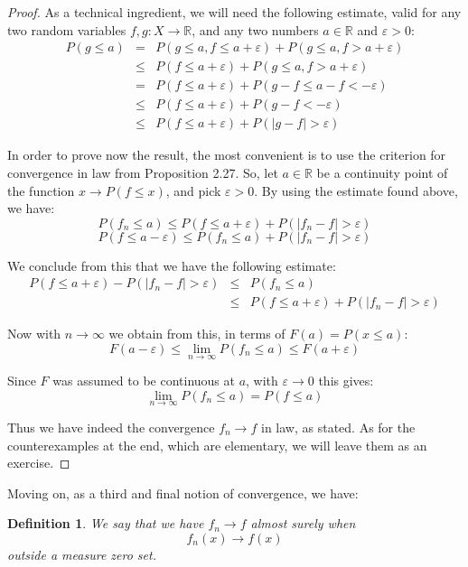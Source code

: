 \documentclass[12pt]{amsbook}
\newtheorem{definition}[theorem]{Definition}
\begin{document}
\begin{proof}
As a technical ingredient, we will need the following estimate, valid for any two random variables $f,g:X\to\mathbb R$, and any two numbers $a\in\mathbb R$ and $\varepsilon>0$:
\begin{eqnarray*}
P(g\leq a)
&=&P(g\leq a,f\leq a+\varepsilon)+P(g\leq a,f>a+\varepsilon)\\
&\leq&P(f\leq a+\varepsilon)+P(g\leq a,f>a+\varepsilon)\\
&=&P(f\leq a+\varepsilon)+P(g-f\leq a-f<-\varepsilon)\\
&\leq&P(f\leq a+\varepsilon)+P(g-f<-\varepsilon)\\
&\leq&P(f\leq a+\varepsilon)+P(|g-f|>\varepsilon)
\end{eqnarray*}

In order to prove now the result, the most convenient is to use the criterion for convergence in law from Proposition 2.27. So, let $a\in\mathbb R$ be a continuity point of the function $x\to P(f\leq x)$, and pick $\varepsilon>0$. By using the estimate found above, we have:
$$P(f_n\leq a)\leq P(f\leq a+\varepsilon)+P(|f_n-f|>\varepsilon)$$
$$P(f\leq a-\varepsilon)\leq P(f_n\leq a)+P(|f_n-f|>\varepsilon)$$

We conclude from this that we have the following estimate:
\begin{eqnarray*}
P(f\leq a+\varepsilon)-P(|f_n-f|>\varepsilon)
&\leq&P(f_n\leq a)\\
&\leq&P(f\leq a+\varepsilon)+P(|f_n-f|>\varepsilon)
\end{eqnarray*}

Now with $n\to\infty$ we obtain from this, in terms of $F(a)=P(x\leq a)$:
$$F(a-\varepsilon)\leq\lim_{n\to\infty}P(f_n\leq a)\leq F(a+\varepsilon)$$

Since $F$ was assumed to be continuous at $a$, with $\varepsilon\to 0$ this gives:
$$\lim_{n\to\infty}P(f_n\leq a)=P(f\leq a)$$

Thus we have indeed the convergence $f_n\to f$ in law, as stated. As for the counterexamples at the end, which are elementary, we will leave them as an exercise.
\end{proof}


Moving on, as a third and final notion of convergence, we have:

\begin{definition}
We say that we have $f_n\to f$ almost surely when 
$$f_n(x)\to f(x)$$
outside a measure zero set.
\end{definition}
\end{document}

